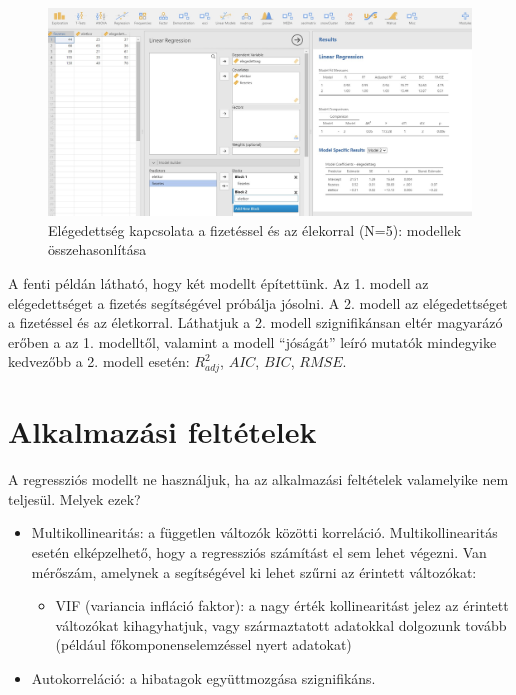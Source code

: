 \documentclass[
  letterpaper,
]{krantz}
\providecommand{\tightlist}{%
  \setlength{\itemsep}{0pt}\setlength{\parskip}{0pt}}\usepackage{longtable,booktabs,array}
\begin{document}
\begin{figure}

{\centering \includegraphics{./images/lin_reg_fizetes_eletkor_elegedettseg_01_kep_05.jpg}

}

\caption{Elégedettség kapcsolata a fizetéssel és az élekorral (N=5):
modellek összehasonlítása}

\end{figure}

A fenti példán látható, hogy két modellt építettünk. Az 1. modell az
elégedettséget a fizetés segítségével próbálja jósolni. A 2. modell az
elégedettséget a fizetéssel és az életkorral. Láthatjuk a 2. modell
szignifikánsan eltér magyarázó erőben a az 1. modelltől, valamint a
modell ``jóságát'' leíró mutatók mindegyike kedvezőbb a 2. modell
esetén: \(R_{adj}^2\), \(AIC\), \(BIC\), \(RMSE\).

\hypertarget{alkalmazuxe1si-feltuxe9telek}{%
\section{Alkalmazási feltételek}\label{alkalmazuxe1si-feltuxe9telek}}

A regressziós modellt ne használjuk, ha az alkalmazási feltételek
valamelyike nem teljesül. Melyek ezek?

\begin{itemize}
\tightlist
\item
  Multikollinearitás: a független változók közötti korreláció.
  Multikollinearitás esetén elképzelhető, hogy a regressziós számítást
  el sem lehet végezni. Van mérőszám, amelynek a segítségével ki lehet
  szűrni az érintett változókat:

  \begin{itemize}
  \tightlist
  \item
    VIF (variancia infláció faktor): a nagy érték kollinearitást jelez
    az érintett változókat kihagyhatjuk, vagy származtatott adatokkal
    dolgozunk tovább (például főkomponenselemzéssel nyert adatokat)
  \end{itemize}
\item
  Autokorreláció: a hibatagok együttmozgása szignifikáns.
\end{itemize}
\end{document}
